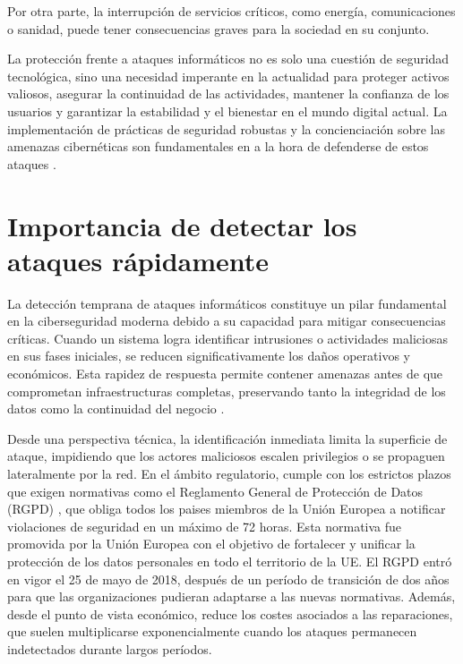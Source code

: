 Por otra parte, la interrupción de servicios críticos, como energía, comunicaciones o sanidad, puede tener consecuencias graves para la sociedad en su conjunto.

La protección frente a ataques informáticos no es solo una cuestión de seguridad tecnológica, sino una necesidad imperante en la actualidad para proteger activos valiosos, asegurar la continuidad de las actividades, mantener la confianza de los usuarios y garantizar la estabilidad y el bienestar en el mundo digital actual. La implementación de prácticas de seguridad robustas y la concienciación sobre las amenazas cibernéticas son fundamentales en a la hora de defenderse de estos ataques \cite{Bada2017}.


\section{Importancia de detectar los ataques rápidamente}

La detección temprana de ataques informáticos constituye un pilar fundamental en la ciberseguridad moderna debido a su capacidad para mitigar consecuencias críticas. Cuando un sistema logra identificar intrusiones o actividades maliciosas en sus fases iniciales, se reducen significativamente los daños operativos y económicos. Esta rapidez de respuesta permite contener amenazas antes de que comprometan infraestructuras completas, preservando tanto la integridad de los datos como la continuidad del negocio \cite{anderson2020}.

Desde una perspectiva técnica, la identificación inmediata limita la superficie de ataque, impidiendo que los actores maliciosos escalen privilegios o se propaguen lateralmente por la red. En el ámbito regulatorio, cumple con los estrictos plazos que exigen normativas como el Reglamento General de Protección de Datos (RGPD) \cite{RGPD2016}, que obliga todos los paises miembros de la Unión Europea a notificar violaciones de seguridad en un máximo de 72 horas. Esta normativa fue promovida por la Unión Europea con el objetivo de fortalecer y unificar la protección de los datos personales en todo el territorio de la UE. El RGPD entró en vigor el 25 de mayo de 2018, después de un período de transición de dos años para que las organizaciones pudieran adaptarse a las nuevas normativas. Además, desde el punto de vista económico, reduce los costes asociados a las reparaciones, que suelen multiplicarse exponencialmente cuando los ataques permanecen indetectados durante largos períodos.


